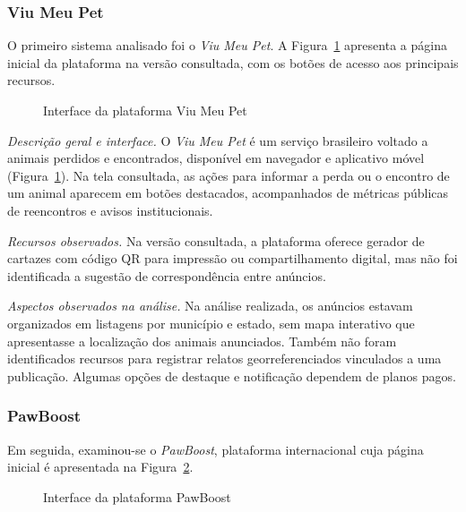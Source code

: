 \subsubsection{Viu Meu Pet}

O primeiro sistema analisado foi o \textit{Viu Meu Pet}. A Figura~\ref{fig:viumeupet} apresenta a página inicial da plataforma na versão consultada, com os botões de acesso aos principais recursos.

\begin{figure}[H]
    \centering
    \caption{Interface da plataforma Viu Meu Pet}
    \label{fig:viumeupet}
\end{figure}

\noindent \textit{Descrição geral e interface.} O \textit{Viu Meu Pet} é um serviço brasileiro voltado a animais perdidos e encontrados, disponível em navegador e aplicativo móvel (Figura~\ref{fig:viumeupet}). Na tela consultada, as ações para informar a perda ou o encontro de um animal aparecem em botões destacados, acompanhados de métricas públicas de reencontros e avisos institucionais.

\vspace{0.25cm}
\noindent \textit{Recursos observados.} Na versão consultada, a plataforma oferece gerador de cartazes com código QR para impressão ou compartilhamento digital, mas não foi identificada a sugestão de correspondência entre anúncios.

\vspace{0.25cm}
\noindent \textit{Aspectos observados na análise.} Na análise realizada, os anúncios estavam organizados em listagens por município e estado, sem mapa interativo que apresentasse a localização dos animais anunciados. Também não foram identificados recursos para registrar relatos georreferenciados vinculados a uma publicação. Algumas opções de destaque e notificação dependem de planos pagos.


\subsubsection{PawBoost}

Em seguida, examinou-se o \textit{PawBoost}, plataforma internacional cuja página inicial é apresentada na Figura~\ref{fig:pawboost}.

\begin{figure}[H]
    \centering
    \caption{Interface da plataforma PawBoost}
    \label{fig:pawboost}
\end{figure}

